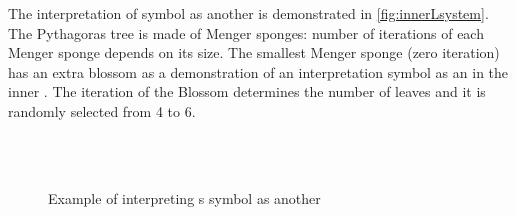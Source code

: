 The interpretation of symbol as another \lsystem is demonstrated in \autoref{fig:innerLsystem}.
The Pythagoras tree is made of Menger sponges: number of iterations of each Menger sponge depends on its size.
The smallest Menger sponge (zero iteration) has an extra blossom as a demonstration of an interpretation symbol as an \lsystem in the inner \lsystem.
The iteration of the Blossom \lsystem determines the number of leaves and it is randomly selected from 4 to 6.


\begin{figure}[p]
	\centering
	\\
	 ~
	\\
	\caption{Example of interpreting s symbol as another \lsystem}
	\label{fig:innerLsystem}
\end{figure}

